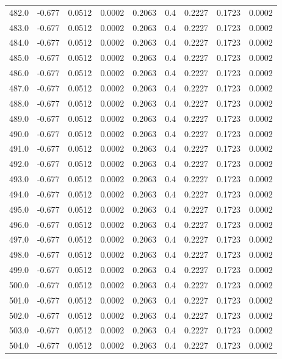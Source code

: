 \begin{longtable}{lrrrrrrrr}
482.0 & -0.677 & 0.0512 & 0.0002 & 0.2063 & 0.4 & 0.2227 & 0.1723 & 0.0002 \\
483.0 & -0.677 & 0.0512 & 0.0002 & 0.2063 & 0.4 & 0.2227 & 0.1723 & 0.0002 \\
484.0 & -0.677 & 0.0512 & 0.0002 & 0.2063 & 0.4 & 0.2227 & 0.1723 & 0.0002 \\
485.0 & -0.677 & 0.0512 & 0.0002 & 0.2063 & 0.4 & 0.2227 & 0.1723 & 0.0002 \\
486.0 & -0.677 & 0.0512 & 0.0002 & 0.2063 & 0.4 & 0.2227 & 0.1723 & 0.0002 \\
487.0 & -0.677 & 0.0512 & 0.0002 & 0.2063 & 0.4 & 0.2227 & 0.1723 & 0.0002 \\
488.0 & -0.677 & 0.0512 & 0.0002 & 0.2063 & 0.4 & 0.2227 & 0.1723 & 0.0002 \\
489.0 & -0.677 & 0.0512 & 0.0002 & 0.2063 & 0.4 & 0.2227 & 0.1723 & 0.0002 \\
490.0 & -0.677 & 0.0512 & 0.0002 & 0.2063 & 0.4 & 0.2227 & 0.1723 & 0.0002 \\
491.0 & -0.677 & 0.0512 & 0.0002 & 0.2063 & 0.4 & 0.2227 & 0.1723 & 0.0002 \\
492.0 & -0.677 & 0.0512 & 0.0002 & 0.2063 & 0.4 & 0.2227 & 0.1723 & 0.0002 \\
493.0 & -0.677 & 0.0512 & 0.0002 & 0.2063 & 0.4 & 0.2227 & 0.1723 & 0.0002 \\
494.0 & -0.677 & 0.0512 & 0.0002 & 0.2063 & 0.4 & 0.2227 & 0.1723 & 0.0002 \\
495.0 & -0.677 & 0.0512 & 0.0002 & 0.2063 & 0.4 & 0.2227 & 0.1723 & 0.0002 \\
496.0 & -0.677 & 0.0512 & 0.0002 & 0.2063 & 0.4 & 0.2227 & 0.1723 & 0.0002 \\
497.0 & -0.677 & 0.0512 & 0.0002 & 0.2063 & 0.4 & 0.2227 & 0.1723 & 0.0002 \\
498.0 & -0.677 & 0.0512 & 0.0002 & 0.2063 & 0.4 & 0.2227 & 0.1723 & 0.0002 \\
499.0 & -0.677 & 0.0512 & 0.0002 & 0.2063 & 0.4 & 0.2227 & 0.1723 & 0.0002 \\
500.0 & -0.677 & 0.0512 & 0.0002 & 0.2063 & 0.4 & 0.2227 & 0.1723 & 0.0002 \\
501.0 & -0.677 & 0.0512 & 0.0002 & 0.2063 & 0.4 & 0.2227 & 0.1723 & 0.0002 \\
502.0 & -0.677 & 0.0512 & 0.0002 & 0.2063 & 0.4 & 0.2227 & 0.1723 & 0.0002 \\
503.0 & -0.677 & 0.0512 & 0.0002 & 0.2063 & 0.4 & 0.2227 & 0.1723 & 0.0002 \\
504.0 & -0.677 & 0.0512 & 0.0002 & 0.2063 & 0.4 & 0.2227 & 0.1723 & 0.0002 \\

\end{longtable}
